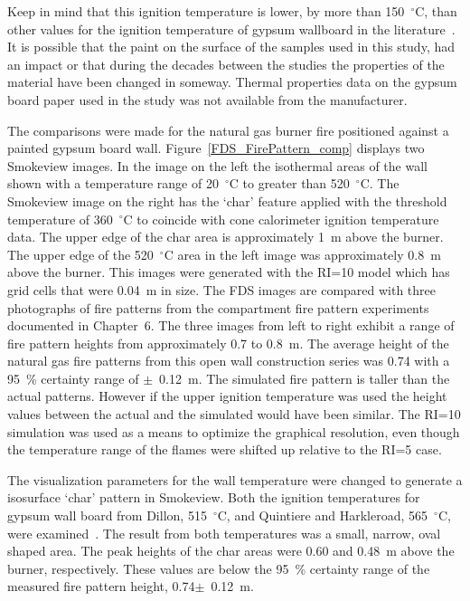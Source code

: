 \documentclass[twoside]{uocthesis}
\begin{document}
{Keep in mind that this ignition temperature is lower, by more than 150~$^\circ$C, than other values for the ignition temperature of gypsum wallboard in the literature~\cite{Dillon:1998,Babrauskas:2003}.  It is possible that the paint on the surface of the samples used in this study, had an impact or that during the decades between the studies the properties of the material have been changed in someway.  Thermal properties data on the gypsum board paper used in the study was not available from the manufacturer.  

The comparisons were made for the natural gas burner fire positioned against a painted gypsum board wall.  Figure~\ref{FDS_FirePattern_comp} displays two Smokeview images.  In the image on the left the isothermal areas of the wall shown with a temperature range of 20~$^\circ$C to greater than 520~$^\circ$C.  The Smokeview image on the right has the `char' feature applied with the threshold temperature of 360~$^\circ$C to coincide with cone calorimeter ignition temperature data. The upper edge of the char area is approximately 1~m above the burner.  The upper edge of the 520~$^\circ$C area in the left image was approximately 0.8~m above the burner. This images were generated with the RI=10 model which has grid cells that were 0.04~m in size. The FDS images are compared with three photographs of fire patterns from the compartment fire pattern experiments documented in Chapter~6.  The three images from left to right exhibit a range of fire pattern heights from approximately 0.7 to 0.8~m.  The average height of the natural gas fire patterns from this open wall construction series was 0.74 with a 95~\% certainty range of $\pm$~0.12~m. The simulated fire pattern is taller than the actual patterns.  However if the upper ignition temperature was used the height values between the actual and the simulated would have been similar.  The RI=10 simulation was used as a means to optimize the graphical resolution, even though the temperature range of the flames were shifted up relative to the RI=5 case.   

The visualization parameters for the wall temperature were changed to generate a isosurface `char' pattern in Smokeview.  Both the ignition temperatures for gypsum wall board from Dillon, 515~$^\circ$C, and Quintiere and Harkleroad, 565~$^\circ$C, were examined~\cite{Dillon:1998,Quintiere:1985}.  The result from both temperatures was a small, narrow, oval shaped area.  The peak heights of the char areas were 0.60 and 0.48~m above the burner, respectively.  These values are below the 95~\% certainty range of the measured fire pattern height, 0.74$\pm$~0.12~m. 

}
\end{document}
